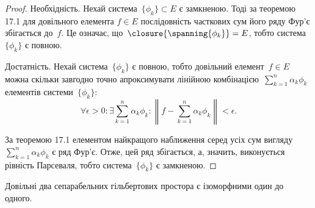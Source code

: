 \begin{proof}
Необхідність. Нехай система~$\{\phi_k\} \subset E$ є
замкненою. Тоді за теоремою 17.1 для довільного елемента
$f \in E$ послідовність часткових сум його ряду Фур’є
збігається до~$f$. Це означає, що~$\closure{\spanning \{\phi_k\}} = E$, тобто
система~$\{\phi_k\}$ є повною.

Достатність. Нехай система~$\{\phi_k\}$ є повною, тобто
довільний елемент~$f \in E$ можна скільки завгодно точно
апроксимувати лінійною комбінацією~$\sum_{k = 1}^n \alpha_k \phi_k$
елементів системи~$\{\phi_k\}$:
\begin{equation*}
    \forall \epsilon > 0: \exists \sum_{k = 1}^n \alpha_k \phi_k:
    \left\| f - \sum_{k = 1}^n \alpha_k \phi_k \right\| < \epsilon.
\end{equation*}

За теоремою 17.1 елементом найкращого наближення
серед усіх сум вигляду~$\sum_{k = 1}^n \alpha_k \phi_k$
є ряд Фур’є. Отже, цей ряд
збігається, а, значить, виконується рівність Парсеваля, тобто
система~$\{\phi_k\}$ є замкненою.
\end{proof}

\begin{theorem}
 Довільні два сепарабельних
гільбертових простора є ізоморфними один до одного.
\end{theorem}

